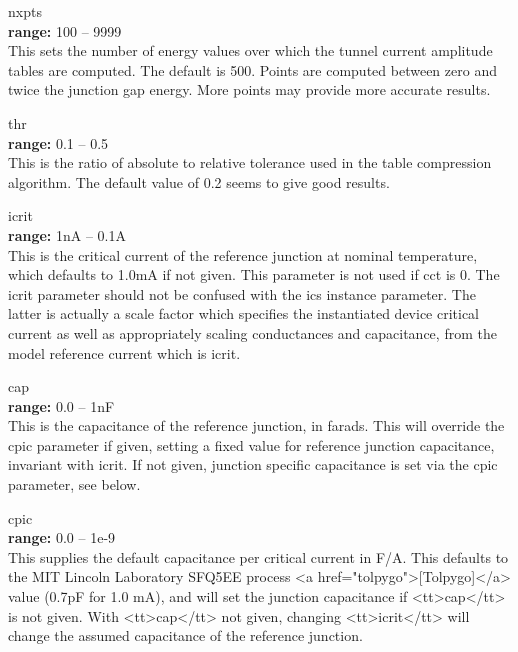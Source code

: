 \begin{description}
\item{\vt nxpts}\\
{\bf range:} 100 -- 9999\\
This sets the number of energy values over which the tunnel current
amplitude tables are computed.  The default is 500.  Points are
computed between zero and twice the junction gap energy.  More points
may provide more accurate results.

\item{\vt thr}\\
{\bf range:} 0.1 -- 0.5\\
This is the ratio of absolute to relative tolerance used in the table
compression algorithm.  The default value of 0.2 seems to give good
results.

\item{\vt icrit}\\
{\bf range:} 1nA -- 0.1A\\
This is the critical current of the reference junction at nominal
temperature, which defaults to 1.0mA if not given.  This parameter is
not used if {\vt cct} is 0.  The {\vt icrit} parameter should not be
confused with the {\vt ics} instance parameter.  The latter is
actually a scale factor which specifies the instantiated device
critical current as well as appropriately scaling conductances and
capacitance, from the model reference current which is {\vt icrit}.

\item{\vt cap}\\
{\bf range:} 0.0 -- 1nF\\
This is the capacitance of the reference junction, in farads.  This
will override the {\vt cpic} parameter if given, setting a fixed value
for reference junction capacitance, invariant with {\vt icrit}.  If
not given, junction specific capacitance is set via the {\vt cpic}
parameter, see below.

\item{\vt cpic}\\
{\bf range:} 0.0 -- 1e-9\\
This supplies the default capacitance per critical current in F/A. 
This defaults to the MIT Lincoln Laboratory SFQ5EE process <a
href="tolpygo">[Tolpygo]</a> value (0.7pF for 1.0 mA), and will set
the junction capacitance if <tt>cap</tt> is not given.  With
<tt>cap</tt> not given, changing <tt>icrit</tt> will change the
assumed capacitance of the reference junction.


\end{description}
